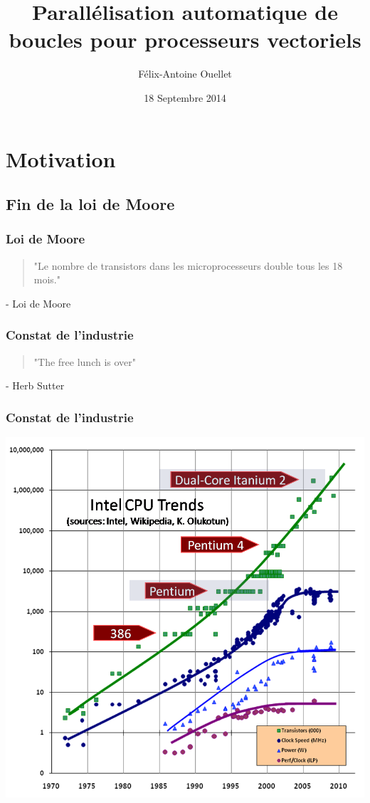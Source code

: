 \documentclass{beamer}
\author[Félix-Antoine Ouellet]{Félix-Antoine Ouellet}
\title[Autovectorization\hspace{2em}\insertframenumber/\inserttotalframenumber]{Parallélisation automatique de boucles pour processeurs vectoriels}
\institute{Université de Sherbrooke}
\date{18 Septembre 2014}
\begin{document}
\begin{frame}
\titlepage %
\end{frame}

\begin{frame}
\tableofcontents[hideallsubsections]
\end{frame}

\section{Motivation}
\subsection{Fin de la loi de Moore}
\begin{frame}
\frametitle{Loi de Moore}
\begin{center}
\begin{quote}
"Le nombre de transistors dans les microprocesseurs double tous les 18 mois."
\end{quote}
\end{center}
\hfill - Loi de Moore
\end{frame}

\begin{frame}
\frametitle{Constat de l'industrie}
\begin{center}
\begin{quote}
"The free lunch is over"
\end{quote}
\end{center}
\hfill - Herb Sutter
\end{frame}

\begin{frame}
\frametitle{Constat de l'industrie}
\begin{center}
\colorbox{white}{\includegraphics[scale=0.4]{CPU.png}}
\end{center}
\end{frame}
\end{document}
